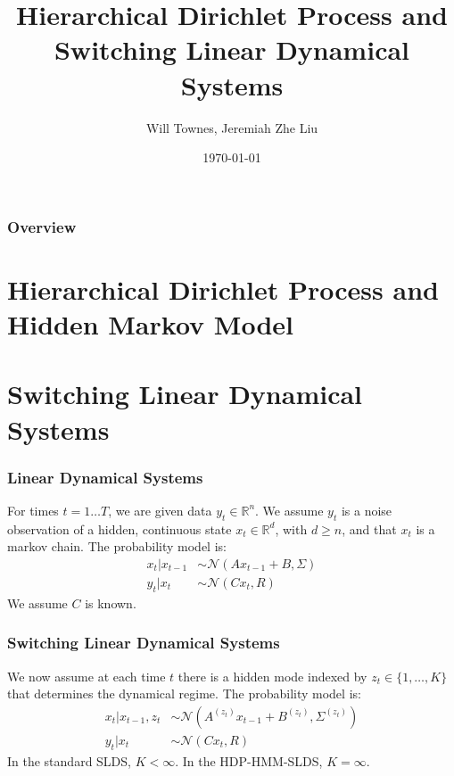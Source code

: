 \documentclass{beamer}
\title[HDP-HMM-SLDS]{Hierarchical Dirichlet Process and Switching Linear Dynamical Systems} %
\author{Will Townes, Jeremiah Zhe Liu} %
\date{\today} %
\begin{document}
\begin{frame}
\titlepage %
\end{frame}

\begin{frame}
\frametitle{Overview} %
\tableofcontents %
\end{frame}


\section{Hierarchical Dirichlet Process and Hidden Markov Model}

\section{Switching Linear Dynamical Systems}
\begin{frame}
\frametitle{Linear Dynamical Systems}

For times $t=1\ldots T$, we are given data $y_t\in\mathbb{R}^n$. We assume $y_t$ is a noise observation of a hidden, continuous state $x_t\in\mathbb{R}^d$, with $d\geq n$, and that $x_t$ is a markov chain. The probability model is:
\begin{align*}
x_t|x_{t-1}&\sim\mathcal{N}(Ax_{t-1}+B,\Sigma)\\
y_t|x_t&\sim\mathcal{N}(Cx_t,R)
\end{align*}
We assume $C$ is known.

\end{frame}

\begin{frame}
\frametitle{Switching Linear Dynamical Systems}

We now assume at each time $t$ there is a hidden mode indexed by $z_t\in\{1,\ldots,K\}$ that determines the dynamical regime. The probability model is:
\begin{align*}
x_t|x_{t-1},z_t&\sim\mathcal{N}(A^{(z_t)}x_{t-1}+B^{(z_t)},\Sigma^{(z_t)})\\
y_t|x_t&\sim\mathcal{N}(Cx_t,R)
\end{align*}
In the standard SLDS, $K<\infty$. In the HDP-HMM-SLDS, $K=\infty$.
\end{frame}
\end{document}
